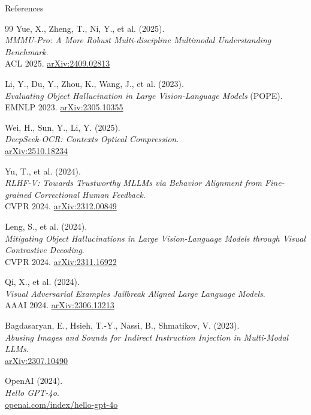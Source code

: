 \begin{frame}[allowframebreaks]{References}
\begin{thebibliography}{99}
      Yue, X., Zheng, T., Ni, Y., et al. (2025). \\
      \emph{MMMU-Pro: A More Robust Multi-discipline Multimodal Understanding Benchmark}.\\
      ACL 2025. \href{https://arxiv.org/abs/2409.02813}{arXiv:2409.02813}

      Li, Y., Du, Y., Zhou, K., Wang, J., et al. (2023). \\
      \emph{Evaluating Object Hallucination in Large Vision-Language Models} (POPE).\\
      EMNLP 2023. \href{https://arxiv.org/abs/2305.10355}{arXiv:2305.10355}

      Wei, H., Sun, Y., Li, Y. (2025). \\
      \emph{DeepSeek-OCR: Contexts Optical Compression}.\\
      \href{https://arxiv.org/abs/2510.18234}{arXiv:2510.18234}

      Yu, T., et al. (2024). \\
      \emph{RLHF-V: Towards Trustworthy MLLMs via Behavior Alignment from Fine-grained Correctional Human Feedback}.\\
      CVPR 2024. \href{https://arxiv.org/abs/2312.00849}{arXiv:2312.00849}

      Leng, S., et al. (2024). \\
      \emph{Mitigating Object Hallucinations in Large Vision-Language Models through Visual Contrastive Decoding}.\\
      CVPR 2024. \href{https://arxiv.org/abs/2311.16922}{arXiv:2311.16922}

      Qi, X., et al. (2024). \\
      \emph{Visual Adversarial Examples Jailbreak Aligned Large Language Models}.\\
      AAAI 2024. \href{https://arxiv.org/abs/2306.13213}{arXiv:2306.13213}

      Bagdasaryan, E., Hsieh, T.-Y., Nassi, B., Shmatikov, V. (2023). \\
      \emph{Abusing Images and Sounds for Indirect Instruction Injection in Multi-Modal LLMs}.\\
      \href{https://arxiv.org/abs/2307.10490}{arXiv:2307.10490}

      OpenAI (2024). \\
      \emph{Hello GPT-4o}.\\
      \href{https://openai.com/index/hello-gpt-4o/}{openai.com/index/hello-gpt-4o}


\end{thebibliography}
\end{frame}
